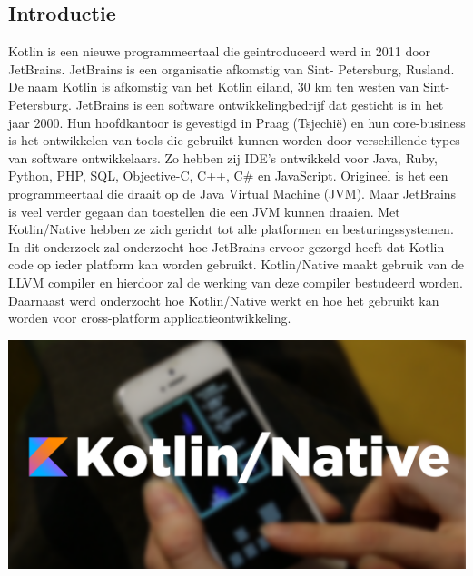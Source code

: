 \documentclass[a0,portrait]{a0poster}
\begin{document}
\begin{multicols}{2}
\color{HoGentAccent1} 
\section*{Introductie}
\color{black}
\color{black}
Kotlin is een nieuwe programmeertaal die geintroduceerd werd in 2011 door JetBrains. JetBrains is een organisatie afkomstig van Sint- Petersburg, Rusland. De naam Kotlin is afkomstig van het Kotlin eiland, 30 km ten westen van Sint-Petersburg. JetBrains is een software ontwikkelingbedrijf dat gesticht is in het jaar 2000. Hun hoofdkantoor is gevestigd in Praag (Tsjechië) en hun core-business is het ontwikkelen van tools die gebruikt kunnen worden door verschillende types van software ontwikkelaars. Zo hebben zij IDE’s ontwikkeld voor Java, Ruby, Python, PHP, SQL, Objective-C, C++, C\# en JavaScript.
\newline
\newline
Origineel is het een programmeertaal die draait op de Java Virtual Machine (JVM). Maar JetBrains is veel verder gegaan dan toestellen die een JVM kunnen draaien. Met Kotlin/Native hebben ze zich gericht tot alle platformen en besturingssystemen. In dit onderzoek zal onderzocht hoe JetBrains ervoor gezorgd heeft dat Kotlin code op ieder platform kan worden gebruikt. Kotlin/Native maakt gebruik van de LLVM compiler en hierdoor zal de werking van deze compiler bestudeerd worden. Daarnaast werd onderzocht hoe Kotlin/Native werkt en hoe het gebruikt kan worden voor cross-platform applicatieontwikkeling.

\begin{center}\vspace{1cm}
	\includegraphics[width=1.0\linewidth]{figures/kn.png}
\end{center}\vspace{1cm}


\end{multicols}
\end{document}
